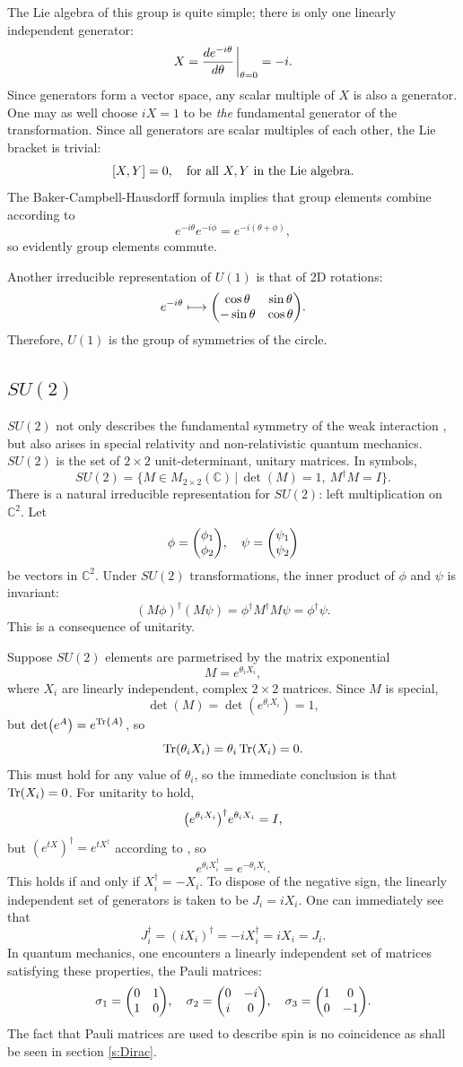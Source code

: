 The Lie algebra of this group is quite simple; there is only one linearly independent generator: $$ X = \dv{e^{-i\theta}}{\theta}\eval_{\theta = 0} = -i.$$
Since generators form a vector space, any scalar multiple of $X$ is also a generator. One may as well choose $iX = 1$ to be \textit{the} fundamental generator of the transformation. Since all generators are scalar multiples of each other, the Lie bracket is trivial: $$\comm{X}{Y} = 0\qc\text{for all $X,Y$ in the Lie algebra.}$$ The Baker-Campbell-Hausdorff formula implies that group elements combine according to $$e^{-i\theta}e^{-i\phi} = e^{-i(\theta+\phi)},$$ so evidently group elements commute.

Another irreducible representation of $U(1)$ is that of 2D rotations: $$e^{-i\theta} \longmapsto \mqty(\cos{\theta} & \sin{\theta} \\ -\sin{\theta} & \cos{\theta}).$$ Therefore, $U(1)$ is the group of symmetries of the circle.

\subsection{\texorpdfstring{$SU(2)$}{SU(2)}}\label{ss:SU2}
$SU(2)$ not only describes the fundamental symmetry of the weak interaction \cite{goldberg_standard_2017}, but also arises in special relativity \cite{schwichtenberg_physics_2017} and non-relativistic quantum mechanics. $SU(2)$ is the set of $2\times 2$ unit-determinant, unitary matrices. In symbols, $$SU(2) = \{ M \in M_{2\times 2}(\mathbb{C})\,|\, \det(M)=1,\ M^{\dagger} M = I\}.$$
There is a natural irreducible representation for $SU(2)$: left multiplication on $\mathbb{C}^2$. Let $$\phi = \mqty(\phi_1 \\ \phi_2) \qc \psi = \mqty( \psi_1 \\ \psi_2)$$ be vectors in $\mathbb{C}^2$. Under $SU(2)$ transformations, the inner product of $\phi$ and $\psi$ is invariant: $$ (M\phi)^{\dagger}(M\psi) = \phi^\dagger M^{\dagger} M \psi = \phi^{\dagger} \psi.$$ This is a consequence of unitarity.

Suppose $SU(2)$ elements are parmetrised by the matrix exponential $$ M = e^{\theta_i X_i},$$ where $X_i$ are linearly independent, complex $2\times 2$ matrices. 
Since $M$ is special, $$\det(M)=\det(e^{\theta_i X_i}) = 1,$$ but $\det(e^{A}) = e^{\Tr{A}}$, so $$\Tr(\theta_i X_i) = \theta_i\Tr(X_i) = 0.$$ This must hold for any value of $\theta_i$, so the immediate conclusion is that $\Tr(X_i)=0$. For unitarity to hold, $$ \qty(e^{\theta_i X_i})^{\dagger} e^{\theta_i X_i} = I,$$ but $(e^{tX})^\dagger = e^{tX^{\dagger}}$ according to \cite{hall_lie_2015}, so $$e^{\theta_i X_i^{\dagger}} = e^{-\theta_i X_i}.$$ This holds if and only if $X_i^{\dagger} = -X_i$. To dispose of the negative sign, the linearly independent set of generators is taken to be $J_i = iX_i$. One can immediately see that $$J_i^{\dagger} = (i X_i)^{\dagger} = -i X_i^{\dagger} = i X_i = J_i. $$ In quantum mechanics, one encounters a linearly independent set of matrices satisfying these properties, the Pauli matrices:
$$\sigma_1 = \mqty(\pmat{1})\qc \sigma_2 = \mqty(\pmat{2})\qc \sigma_3 = \mqty(\pmat{3}).$$ The fact that Pauli matrices are used to describe spin is no coincidence as shall be seen in section \ref{s:Dirac}.

